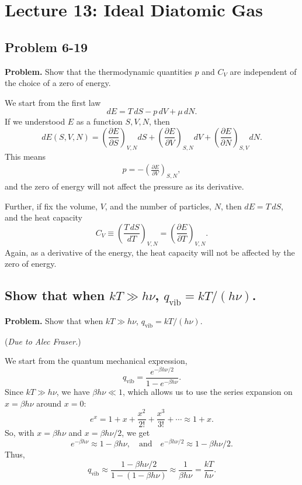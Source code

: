 \documentclass[twocolumn, 10pt]{article}
\numberwithin{equation}{section}
\newenvironment{problem}
{\par\medskip\sffamily \color{problue}
  \textbf{Problem. }\ignorespaces}
{\medskip}
\newenvironment{solution}[1][\empty]
{\par\medskip
  \textbf{\ifx\empty#1{Solution.}\relax\else{#1}\fi} \ignorespaces}
{\medskip}
\begin{document}
\section{Lecture 13: Ideal Diatomic Gas}

\subsection{Problem 6-19}

\begin{problem}
Show that the thermodynamic quantities $p$ and $C_V$
are independent of the choice of a zero of energy.
\end{problem}

\begin{solution}
We start from the first law
$$dE = T \, dS - p \, dV + \mu \, dN.$$
If we understood $E$ as a function $S, V, N$,
then
$$
  dE(S, V, N)
  =
   \left( \frac{\partial E}{\partial S} \right)_{V, N} dS
  +\left( \frac{\partial E}{\partial V} \right)_{S, N} dV
  +\left( \frac{\partial E}{\partial N} \right)_{S, V} dN
  .
$$
This means
\begin{align*}
  p = -\left( \frac{\partial E}{\partial V} \right)_{S, N},
\end{align*}
and the zero of energy will not affect the pressure as its derivative.

Further, if fix the volume, $V$, and the number of particles, $N$,
then $dE = T \, dS$,
and the heat capacity
$$
  C_V \equiv \left( \frac{ T \, dS } { dT } \right)_{V, N}
  = \left( \frac{ \partial E } { \partial T } \right)_{V, N}.
$$
Again, as a derivative of the energy,
the heat capacity will not be affected by the zero of energy.
\end{solution}


\subsection{Show that when $kT \gg h\nu$, $q_\mathrm{vib} = kT/(h\nu)$.}

\begin{problem}
Show that when $kT \gg h\nu$, $q_\mathrm{vib} = kT/(h\nu)$.
\end{problem}

\begin{solution}
  (\emph{Due to Alec Fraser.})

We start from the quantum mechanical expression,
$$
q_\mathrm{vib} = \frac{e^{-\beta h\nu/2}}{1- e^{-\beta h\nu}}.
$$
Since $kT \gg h\nu$, we have $\beta h\nu \ll 1$,
which allows us to use the series expansion on $x = \beta h \nu$
around $x = 0$:
%
$$
e^x = 1 + x + \frac{x^2}{2!} + \frac{x^3}{3!} + \cdots \approx 1 + x.
$$
%
So, with $x = \beta h \nu$ and $x = \beta h \nu/2$, we get
$$
e^{-\beta h \nu} \approx 1 - \beta h \nu,
\quad
\mbox{and}
\quad
e^{-\beta h \nu/2} \approx 1 - \beta h \nu/2.
$$
Thus,
$$q_\mathrm{vib} \approx
\frac{1-\beta h\nu/2}{1- (1-\beta h\nu)}
\approx
\frac{1}{\beta h\nu} = \frac{kT}{h\nu}.
$$
\end{solution}
\end{document}
